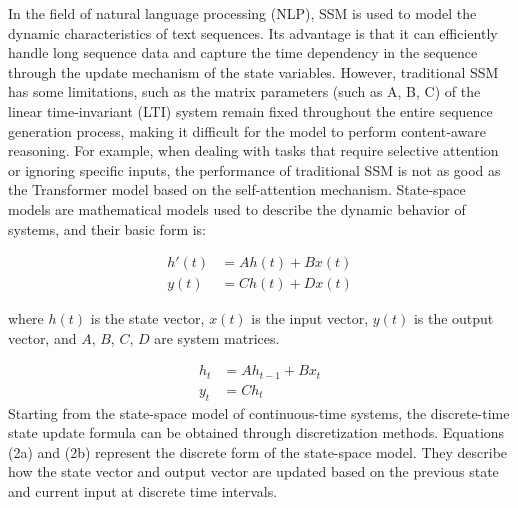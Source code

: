 \documentclass{article}
\theoremstyle{plain}
\theoremstyle{definition}
\theoremstyle{remark}
\begin{document}
In the field of natural language processing (NLP), SSM is used to model the dynamic characteristics of text sequences. Its advantage is that it can efficiently handle long sequence data and capture the time dependency in the sequence through the update mechanism of the state variables. However, traditional SSM has some limitations, such as the matrix parameters (such as A, B, C) of the linear time-invariant (LTI) system remain fixed throughout the entire sequence generation process, making it difficult for the model to perform content-aware reasoning. For example, when dealing with tasks that require selective attention or ignoring specific inputs, the performance of traditional SSM is not as good as the Transformer model based on the self-attention mechanism.
State-space models are mathematical models used to describe the dynamic behavior of systems, and their basic form is:

\begin{equation}
\begin{aligned}
   h'(t) &= Ah(t) + Bx(t) \\
   y(t) &= Ch(t) + Dx(t)
\end{aligned}
\end{equation}

where $h(t)$ is the state vector, $x(t)$ is the input vector, $y(t)$ is the output vector, and $A$, $B$, $C$, $D$ are system matrices.

\begin{equation}
\begin{aligned}
   h_t &= Ah_{t-1} + Bx_t \\
   y_t &= Ch_t
\end{aligned}
\end{equation}
Starting from the state-space model of continuous-time systems, the discrete-time state update formula can be obtained through discretization methods. Equations (2a) and (2b) represent the discrete form of the state-space model. They describe how the state vector and output vector are updated based on the previous state and current input at discrete time intervals.
         
\end{document}
